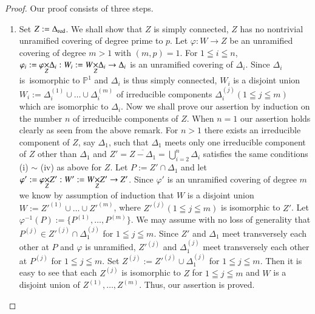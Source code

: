 \begin{proof}
Our proof consists of three steps.
\begin{enumerate}
\renewcommand{\theenumi}{\Roman{enumi}}
\renewcommand{\labelenumi}{\rm(\theenumi)}
\item Set $Z:=\Delta_{\operatorname{red}}$. We shall show that $Z$ is simply
  connected, \iec $Z$ has no nontrivial unramified covering of degree
  prime to $p$. Let $\varphi:W\to Z$ be an unramified covering of
  degree $m>1$ with $(m,p)=1$. For $1\leqq i\leqq n$,
  $\varphi_{i}:=\fprod{\varphi}{\Delta_{i}}{Z}:W_{i}:=\fprod{W}{\Delta_{i}}{Z}\to\Delta_{i}$
  is an unramified covering of $\Delta_{i}$. Since $\Delta_{i}$
  is\pageoriginale\ isomorphic to $\mathbb{P}^{1}$ and $\Delta_{i}$ is
  thus simply connected, $W_{i}$ is a disjoint union
  $W_{i}:=\Delta^{(1)}_{i}\cup\ldots\cup \Delta^{(m)}_{i}$ of
  irreducible components $\Delta^{(j)}_{i}(1\leqq j\leqq m)$ which are
  isomorphic to $\Delta_{i}$. Now we shall prove our assertion by
  induction on the number $n$ of irreducible components of $Z$. When
  $n=1$ our assertion holds clearly as seen from the above remark. For
  $n>1$ there exists an irreducible component of $Z$, say
  $\Delta_{1}$, such that $\Delta_{1}$ meets only one irreducible
  component of $Z$ other than $\Delta_{1}$ and
  $Z'=\overline{Z-\Delta_{1}}={\displaystyle{\mathop{\bigcup}^{n}_{i=2}}}\Delta_{i}$
  satisfies the same conditions (i) $\sim$ (iv) as above for $Z$. Let
  $P:=Z'\cap \Delta_{1}$ and let
  $\varphi':=\fprod{\varphi}{Z'}{Z}:W':=\fprod{W}{Z'}{Z}\to Z'$. Since
  $\varphi'$ is an unramified covering of degree $m$ we know by
  assumption of induction that $W$ is a disjoint union
  $W:={Z'}^{(1)}\cup\ldots\cup {Z'}^{(m)}$, where ${Z'}^{(j)}(1\leqq
  j\leqq m)$ is isomorphic to $Z'$. Let
  $\varphi^{-1}(P):=\{P^{(1)},\ldots,P^{(m)}\}$. We may assume with no
  loss of generality that $P^{(j)}\in {Z'}^{(j)}\cap \Delta^{(j)}_{1}$
  for $1\leqq j\leqq m$. Since $Z'$ and $\Delta_{1}$ meet
  transversely each other at $P$ and $\varphi$ is unramified,
  ${Z'}^{(j)}$ and $\Delta^{(j)}_{1}$ meet transversely each other at
  $P^{(j)}$ for $1\leqq j\leqq m$. Set
  $Z^{(j)}:={Z'}^{(j)}\cup\Delta^{(j)}_{1}$ for $1\leqq j\leqq
  m$. Then it is easy to see that each $Z^{(j)}$ is isomorphic to $Z$
  for $1\leqq j\leqq m$ and $W$ is a disjoint union of
  $Z^{(1)},\ldots,Z^{(m)}$. Thus, our assertion is proved.


\end{enumerate}
\end{proof}
